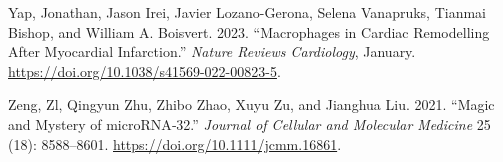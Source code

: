 \documentclass[smallextended]{svjour3}       %
\newlength{\cslhangindent}
\newlength{\cslentryspacingunit} %
\newenvironment{CSLReferences}[2] %
 {%
  \setlength{\parindent}{0pt}
  \ifodd #1
  \let\oldpar\par
  \def\par{\hangindent=\cslhangindent\oldpar}
  \fi
  \setlength{\parskip}{#2\cslentryspacingunit}
 }%
 {}
\begin{document}
\begin{CSLReferences}{1}{0}
\leavevmode{}%
Yap, Jonathan, Jason Irei, Javier Lozano-Gerona, Selena Vanapruks,
Tianmai Bishop, and William A. Boisvert. 2023. {``Macrophages in Cardiac
Remodelling After Myocardial Infarction.''} \emph{Nature Reviews
Cardiology}, January. \url{https://doi.org/10.1038/s41569-022-00823-5}.

\leavevmode{}%
Zeng, Zl, Qingyun Zhu, Zhibo Zhao, Xuyu Zu, and Jianghua Liu. 2021.
{``Magic and Mystery of {microRNA}‐32.''} \emph{Journal of Cellular and
Molecular Medicine} 25 (18): 8588--8601.
\url{https://doi.org/10.1111/jcmm.16861}.

\end{CSLReferences}




\end{document}
